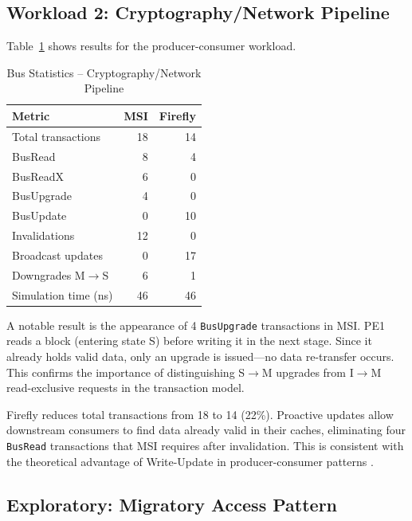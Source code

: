 \documentclass[journal,trans]{IEEEtran}
\begin{document}
\subsection{Workload 2: Cryptography/Network Pipeline}
 
Table~\ref{tab:pipeline} shows results for the producer-consumer workload.
 \begin{table}[htbp]
 \centering
\caption{Bus Statistics -- Cryptography/Network Pipeline}
\label{tab:pipeline}
\renewcommand{\arraystretch}{1.2}
\begin{tabular}{lrr}
\toprule
\textbf{Metric}         & \textbf{MSI} & \textbf{Firefly} \\
\midrule
Total transactions      & 18  & 14  \\
BusRead                 & 8   & 4   \\
BusReadX                & 6   & 0   \\
BusUpgrade              & 4   & 0   \\
BusUpdate               & 0   & 10  \\
Invalidations           & 12  & 0   \\
Broadcast updates       & 0   & 17  \\
Downgrades M$\to$S      & 6   & 1   \\
Simulation time (ns)    & 46  & 46  \\
\bottomrule
\end{tabular}
\end{table}
 
A notable result is the appearance of 4 \texttt{BusUpgrade} transactions in
MSI. PE1 reads a block (entering state S) before writing it in the next stage.
Since it already holds valid data, only an upgrade is issued---no data
re-transfer occurs. This confirms the importance of distinguishing
S$\to$M upgrades from I$\to$M read-exclusive requests in the transaction model.
 
Firefly reduces total transactions from 18 to 14 (22\%). Proactive updates allow
downstream consumers to find data already valid in their caches, eliminating
four \texttt{BusRead} transactions that MSI requires after invalidation. This
is consistent with the theoretical advantage of Write-Update in producer-consumer
patterns \cite{nagarajan2020primer, thacker1988firefly}.
 
\subsection{Exploratory: Migratory Access Pattern}
 
\end{document}
